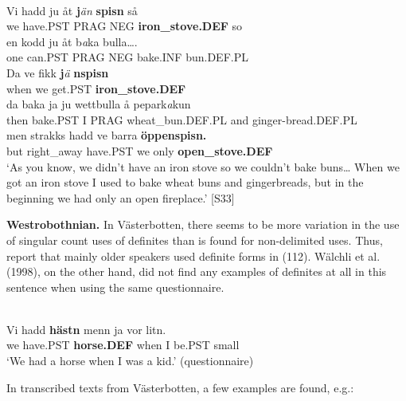 \ea \label{} 
\\
\gll Vi  hadd  ju  åt  \textbf{j}\textit{än} \textbf{spisn} så\\
we  have.PST  PRAG  NEG  \textbf{iron\_stove.DEF} so\\
\gll en  kodd  ju  åt  b\textit{a}ka  bulla….\\
one  can.PST  PRAG  NEG  bake.INF  bun.DEF.PL\\
\gll Da  ve  fikk  \textbf{j}\textit{ä} \textbf{nspisn}\\
when  we  get.PST  \textbf{iron\_stove.DEF}\\
\gll da  baka  ja  ju  wettbulla  å  pepark\textit{a}kun\\
then  bake.PST  I  PRAG  wheat\_bun.DEF.PL  and  ginger-bread.DEF.PL\\
\gll men  strakks  hadd  ve  barra  \textbf{öppenspisn.}\\
but  right\_away  have.PST  we  only  \textbf{open\_stove.DEF}\\
\glt ‘As you know, we didn’t have an iron stove so we couldn’t bake buns… When we got an iron stove I used to bake wheat buns and gingerbreads, but in the beginning we had only an open fireplace.’ [S33]

\z

\textbf{Westrobothnian.} In Västerbotten, there seems to be more variation in the use of singular count uses of definites than is found for non-delimited uses. Thus, \citet{BergholmEtAl1999} report that mainly older speakers used definite forms in (112). Wälchli et al. (1998), on the other hand, did not find any examples of definites at all in this sentence when using the same questionnaire.


\ea \label{} 
\\
\gll Vi  hadd  \textbf{hästn} menn  ja  vor  litn.\\
we  have.PST  \textbf{horse.DEF} when  I   be.PST  small\\
\glt ‘We had a horse when I was a kid.’ (questionnaire)

\z

In transcribed texts from Västerbotten, a few examples are found, e.g.:


